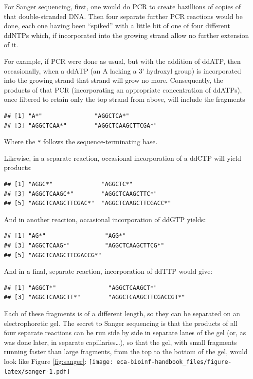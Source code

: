 \documentclass[]{krantz}
\begin{document}
For Sanger sequencing, first, one would do PCR to create
bazillions of copies of that double-stranded DNA. Then four separate further PCR
reactions would be done, each one having been ``spiked'' with a little bit of
one of four different ddNTPs which, if incorporated into the
growing strand allow no further extension of it.

For example, if PCR were done as usual, but with the addition of ddATP,
then occasionally, when a ddATP (an A lacking a 3' hydroxyl group)
is incorporated into the growing strand that strand will grow no more.
Consequently, the products of that PCR (incorporating an appropriate
concentration of ddATPs), once filtered to retain only
the top strand from above, will include the fragments

\begin{verbatim}
## [1] "A*"               "AGGCTCA*"        
## [3] "AGGCTCAA*"        "AGGCTCAAGCTTCGA*"
\end{verbatim}

Where the \texttt{*} follows the sequence-terminating base.

Likewise, in a separate reaction, occasional incorporation of a ddCTP will yield products:

\begin{verbatim}
## [1] "AGGC*"              "AGGCTC*"           
## [3] "AGGCTCAAGC*"        "AGGCTCAAGCTTC*"    
## [5] "AGGCTCAAGCTTCGAC*"  "AGGCTCAAGCTTCGACC*"
\end{verbatim}

And in another reaction, occasional incorporation of ddGTP yields:

\begin{verbatim}
## [1] "AG*"                 "AGG*"               
## [3] "AGGCTCAAG*"          "AGGCTCAAGCTTCG*"    
## [5] "AGGCTCAAGCTTCGACCG*"
\end{verbatim}

And in a final, separate reaction, incorporation of ddTTP would give:

\begin{verbatim}
## [1] "AGGCT*"               "AGGCTCAAGCT*"        
## [3] "AGGCTCAAGCTT*"        "AGGCTCAAGCTTCGACCGT*"
\end{verbatim}

Each of these fragments is of a different length, so they can be
separated on an electrophoretic gel. The secret to Sanger sequencing is that
the products of all four separate reactions can be run side by side in
separate lanes of the gel (or, as was done later, in separate capillaries\ldots{}),
so that the gel, with small
fragments running faster than large fragments, from the top to the bottom
of the gel, would look like Figure \ref{fig:sanger}:
\texttt{[image: eca-bioinf-handbook\_files/figure-latex/sanger-1.pdf]}
\end{document}
